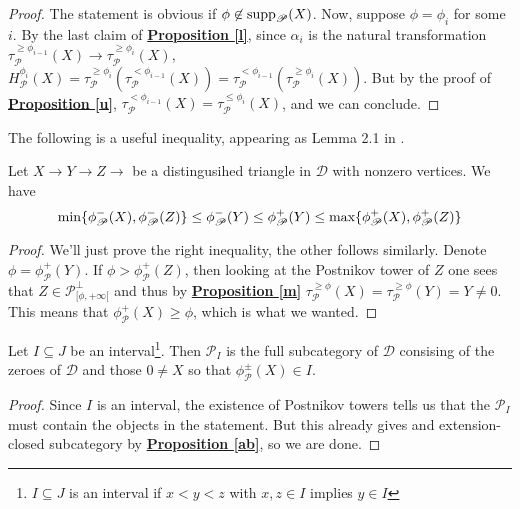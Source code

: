 \begin{proof}
The statement is obvious if $\phi \not \in \textnormal{supp}_{\mathscr{P}}(X)$. Now, suppose $\phi=\phi_i$ for some $i$. By the last claim of \hyperref[l]{\textbf{Proposition \ref*{l}}}, since $\alpha_i$ is the natural transformation $\tau^{\ge \phi_{i-1}}_{\mathscr{P}}(X) \longrightarrow \tau^{\ge \phi_i}_{\mathscr{P}}(X)$, $H_{\mathscr{P}}^{\phi_i}(X)=\tau^{\ge \phi_i}_{\mathscr{P}}(\tau^{< \phi_{i-1}}_{\mathscr{P}}(X))= \tau^{< \phi_{i-1}}_{\mathscr{P}}(\tau^{\ge \phi_i}_{\mathscr{P}}(X))$. But by the proof of \hyperref[u]{\textbf{Proposition \ref*{u}}}, $\tau^{< \phi_{i-1}}_{\mathscr{P}}(X)=\tau^{\le \phi_i}_{\mathscr{P}}(X)$, and we can conclude. 
\end{proof}

The following is a useful inequality, appearing as Lemma 2.1 in \cite{okad}.

\begin{prop}\label{ab}
Let $X \longrightarrow Y \longrightarrow Z \longrightarrow $ be a distingusihed triangle in $\mathscr{D}$ with nonzero vertices. We have $$\textnormal{min} \{ \phi^-_{\mathscr{P}}(X), \phi^-_{\mathscr{P}}(Z) \} \le \phi^-_{\mathscr{P}}(Y) \le \phi^+_{\mathscr{P}}(Y) \le \textnormal{max} \{ \phi^+_{\mathscr{P}}(X), \phi^+_{\mathscr{P}}(Z) \}$$
\end{prop}

\begin{proof}
We'll just prove the right inequality, the other follows similarly. Denote $\phi=\phi^+_{\mathscr{P}}(Y)$. If $\phi > \phi^+_{\mathscr{P}}(Z)$, then looking at the Postnikov tower of $Z$ one sees that $Z \in \mathscr{P}_{[\phi, + \infty[}^{\perp}$ and thus by \hyperref[m]{\textbf{Proposition \ref*{m}}} $\tau^{\ge \phi}_{\mathscr{P}}(X)=\tau^{\ge \phi}_{\mathscr{P}}(Y)=Y \not = 0$. This means that $\phi^+_{\mathscr{P}}(X) \ge \phi$, which is what we wanted. 
\end{proof}

\begin{prop}\label{ac}
Let $I \subseteq J$ be an interval\footnote{$I \subseteq J$ is an interval if $x < y < z$ with $x,z \in I$ implies $y \in I$}. Then $\mathscr{P}_I$ is the full subcategory of $\mathscr{D}$ consising of the zeroes of $\mathscr{D}$ and those $0\not = X$ so that $\phi^{\pm}_{\mathscr{P}}(X) \in I$.
\end{prop}

\begin{proof}
Since $I$ is an interval, the existence of Postnikov towers tells us that the $\mathscr{P}_I$ must contain the objects in the statement. But this already gives and extension-closed subcategory by \hyperref[ab]{\textbf{Proposition \ref*{ab}}}, so we are done. 
\end{proof}

